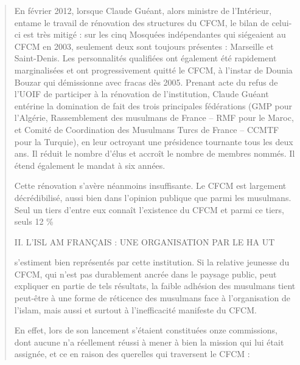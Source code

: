 \begin{quote}
En février 2012, lorsque Claude Guéant, alors ministre de l'Intérieur,
entame le travail de rénovation des structures du CFCM, le bilan de
celui-ci est très mitigé : sur les cinq Mosquées indépendantes qui
siégeaient au CFCM en 2003, seulement deux sont toujours présentes :
Marseille et Saint-Denis. Les personnalités qualifiées ont également été
rapidement marginalisées et ont progressivement quitté le CFCM, à
l'instar de Dounia Bouzar qui démissionne avec fracas dès 2005. Prenant
acte du refus de l'UOIF de participer à la rénovation de l'institution,
Claude Guéant entérine la domination de fait des trois principales
fédérations (GMP pour l'Algérie, Rassemblement des musulmans de France
-- RMF pour le Maroc, et Comité de Coordination des Musulmans Turcs de
France -- CCMTF pour la Turquie), en leur octroyant une présidence
tournante tous les deux ans. Il réduit le nombre d'élus et accroît le
nombre de membres nommés. Il étend également le mandat à six années.

Cette rénovation s'avère néanmoins insuffisante. Le CFCM est largement
décrédibilisé, aussi bien dans l'opinion publique que parmi les
musulmans. Seul un tiers d'entre eux connaît l'existence du CFCM et
parmi ce tiers, seuls 12 \%

II. L'ISL AM FRANÇAIS : UNE ORGANISATION PAR LE HA UT

s'estiment bien représentés par cette institution. Si la relative
jeunesse du CFCM, qui n'est pas durablement ancrée dans le paysage
public, peut expliquer en partie de tels résultats, la faible adhésion
des musulmans tient peut-être à une forme de réticence des musulmans
face à l'organisation de l'islam, mais aussi et surtout à l'inefficacité
manifeste du CFCM.

En effet, lors de son lancement s'étaient constituées onze commissions,
dont aucune n'a réellement réussi à mener à bien la mission qui lui
était assignée, et ce en raison des querelles qui traversent le CFCM :
\end{quote}

